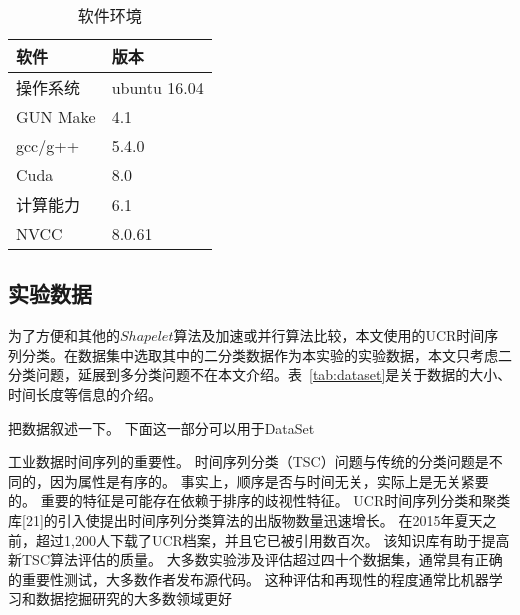 \begin{table}[htb]
	\centering

	\begin{minipage}{0.5\textwidth}
		\caption{软件环境}
		\label{tab:software}
		\begin{tabular}{p{2cm}p{3cm}}
			\toprule[1.5pt]
			{\heiti 软件} & {\heiti 版本} \\\midrule[1pt]
			操作系统 & ubuntu 16.04 \\
			GUN Make & 4.1 \\
			gcc/g++ & 5.4.0 \\
			Cuda & 8.0 \\
			计算能力 & 6.1 \\
			NVCC & 8.0.61 \\
			\bottomrule[1.5pt]
		\end{tabular}
	\end{minipage}
\end{table}


\subsection{实验数据}
为了方便和其他的$Shapelet$算法及加速或并行算法比较，本文使用的UCR时间序列分类\cite{UCRArchive}。在数据集中选取其中的二分类数据作为本实验的实验数据，本文只考虑二分类问题，延展到多分类问题不在本文介绍。表~\ref{tab:dataset}是关于数据的大小、时间长度等信息的介绍。

把数据叙述一下。
下面这一部分可以用于DataSet

工业数据时间序列的重要性。
时间序列分类（TSC）问题与传统的分类问题是不同的，因为属性是有序的。 事实上，顺序是否与时间无关，实际上是无关紧要的。 重要的特征是可能存在依赖于排序的歧视性特征。 UCR时间序列分类和聚类库[21]的引入使提出时间序列分类算法的出版物数量迅速增长。 在2015年夏天之前，超过1,200人下载了UCR档案，并且它已被引用数百次。 该知识库有助于提高新TSC算法评估的质量。 大多数实验涉及评估超过四十个数据集，通常具有正确的重要性测试，大多数作者发布源代码。 这种评估和再现性的程度通常比机器学习和数据挖掘研究的大多数领域更好


